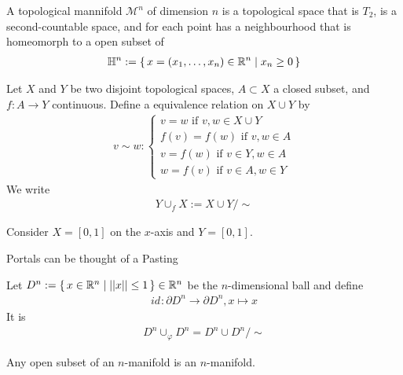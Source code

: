 \begin{defbox}
    \begin{definition}
        A topological mannifold \(\mathcal{M}^n\) of dimension \(n\) is a topological space that is \(T_2\), is a second-countable space, and for each point has a neighbourhood that is homeomorph to a open subset of
        \begin{align*}
            \mathbb{H}^n := \left\{\, x = (x_1, \ldots, x_n) \in \mathbb{R}^n \mid x_n \geq 0 \,\right\}
        \end{align*}
    \end{definition}
\end{defbox}

\begin{defbox}
    \begin{definition}[Pasting]
        Let \(X\) and \(Y\) be two disjoint topological spaces, \(A \subset X\) a closed subset, and \(f: A \longrightarrow Y\) continuous. Define a equivalence relation on \(X \cup Y\) by
        \begin{align*}
            v \sim w :
            \begin{cases}
                v = w \text{ if } v, w \in X \cup Y \\
                f(v) = f(w) \text{ if } v, w \in A \\
                v = f(w) \text{ if } v \in Y, w \in A \\
                w = f(v) \text{ if } v \in A, w \in Y
            \end{cases}
        \end{align*}
        We write
        \begin{align*}
            Y \cup_f X := X \cup Y / \sim
        \end{align*}
    \end{definition}
\end{defbox}
\begin{example}
    Consider \(X = [0, 1]\) on the \(x\)-axis and \(Y = [0, 1]\).
\end{example}
\begin{example}
    Portals can be thought of a Pasting
\end{example}

\begin{example}
    Let \(D^n := \left\{\, x \in \mathbb{R}^n \mid ||x|| \leq 1 \,\right\}\in \mathbb{R}^n\) be the \(n\)-dimensional ball and define
    \begin{align*}
        id_{}: \partial D^n \longrightarrow \partial D^n, x \mapsto x
    \end{align*}
    It is
    \begin{align*}
        D^n \cup_{\varphi} D^n = D^n \cup D^n / \sim
    \end{align*}
\end{example}

\begin{thmbox}
    \begin{lemma}
        Any open subset of an \(n\)-manifold is an \(n\)-manifold.
    \end{lemma}
\end{thmbox}